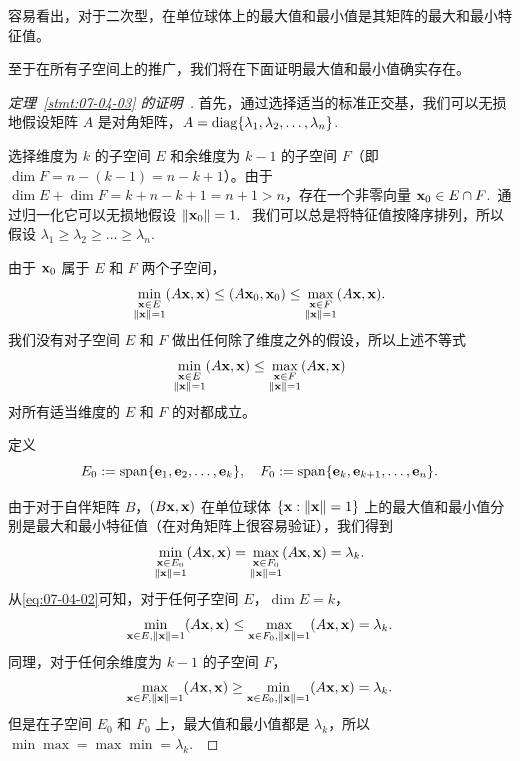 容易看出，对于二次型，在单位球体上的最大值和最小值是其矩阵的最大和最小特征值。

至于在所有子空间上的推广，我们将在下面证明最大值和最小值确实存在。


\begin{proof}[\normalfont\heiti 定理~\ref{stmt:07-04-03} 的证明~\nopunct]
首先，通过选择适当的标准正交基，我们可以无损地假设矩阵 $A$ 是对角矩阵，$A = \operatorname{diag}\{\lambda_1, \lambda_2, \dots, \lambda_n\}$.~

选择维度为 $k$ 的子空间 $E$ 和余维度为 $k-1$ 的子空间 $F$（即 $\dim F = n - (k-1) = n - k + 1$）。由于 $\dim E + \dim F = k + n - k + 1 = n+1 > n$，存在一个非零向量 $\mathbf{x}_0 \in E \cap F$.~通过归一化它可以无损地假设 $\|\mathbf{x}_0\| = 1$.~
我们可以总是将特征值按降序排列，所以假设 $\lambda_1 \ge \lambda_2 \ge \dots \ge \lambda_n$.~

由于 $\mathbf{x}_0$ 属于 $E$ 和 $F$ 两个子空间，
$$\min_{\substack{\mathbf{x} \in E\\ \|\mathbf{x}\|=1}} (A\mathbf{x}, \mathbf{x}) \le (A\mathbf{x}_0, \mathbf{x}_0) \le \max_{\substack{\mathbf{x} \in F\\ \|\mathbf{x}\|=1}} (A\mathbf{x}, \mathbf{x}).$$
我们没有对子空间 $E$ 和 $F$ 做出任何除了维度之外的假设，所以上述不等式
\begin{equation}\label{eq:07-04-02}
\min_{\substack{\mathbf{x} \in E\\ \|\mathbf{x}\|=1}} (A\mathbf{x}, \mathbf{x}) \le \max_{\substack{\mathbf{x} \in F\\ \|\mathbf{x}\|=1}} (A\mathbf{x}, \mathbf{x})
\end{equation}
对所有适当维度的 $E$ 和 $F$ 的对都成立。

定义 $$E_0 := \operatorname{span}\{\mathbf{e}_1, \mathbf{e}_2, \dots, \mathbf{e}_k\},\quad F_0 := \operatorname{span}\{\mathbf{e}_k, \mathbf{e}_{k+1}, \dots, \mathbf{e}_n\}.$$

由于对于自伴矩阵 $B$，$(B\mathbf{x}, \mathbf{x})$ 在单位球体 $\{\mathbf{x} : \|\mathbf{x}\|=1\}$ 上的最大值和最小值分别是最大和最小特征值（在对角矩阵上很容易验证），我们得到
$$\min_{\substack{\mathbf{x} \in E_0\\ \|\mathbf{x}\|=1}} (A\mathbf{x}, \mathbf{x}) = \max_{\substack{\mathbf{x} \in F_0\\ \|\mathbf{x}\|=1}} (A\mathbf{x}, \mathbf{x}) = \lambda_k.$$
从\eqref{eq:07-04-02}可知，对于任何子空间 $E$，$\dim E = k$，
$$\min_{\mathbf{x} \in E, \|\mathbf{x}\|=1} (A\mathbf{x}, \mathbf{x}) \le \max_{\mathbf{x} \in F_0, \|\mathbf{x}\|=1} (A\mathbf{x}, \mathbf{x}) = \lambda_k.$$
同理，对于任何余维度为 $k-1$ 的子空间 $F$，
$$\max_{\mathbf{x} \in F, \|\mathbf{x}\|=1} (A\mathbf{x}, \mathbf{x}) \ge \min_{\mathbf{x} \in E_0, \|\mathbf{x}\|=1} (A\mathbf{x}, \mathbf{x}) = \lambda_k.$$
但是在子空间 $E_0$ 和 $F_0$ 上，最大值和最小值都是 $\lambda_k$，所以 $\min \max = \max \min = \lambda_k$.~\end{proof}

